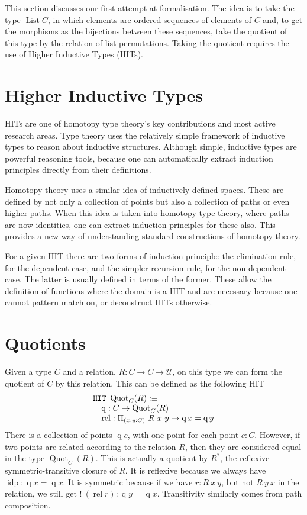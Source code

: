 \documentclass[12pt, parskip, DIV=14]{scrbook}
\newcommand{\defeq}{\vcentcolon\equiv}
\newcommand{\idp}{\operatorname{idp}}
\newcommand{\List}{\operatorname{List}}
\newcommand{\Quot}{\operatorname{Quot}_C(R)}
\newcommand{\q}{\operatorname{q}}
\newcommand{\rel}{\operatorname{rel}}
\begin{document}
This section discusses our first attempt at formalisation. The idea is to take the type $\List C$, in which elements are ordered sequences of elements of $C$ and, to get the morphisms as the bijections between these sequences, take the quotient of this type by the relation of list permutations. Taking the quotient requires the use of Higher Inductive Types (HITs).

\section{Higher Inductive Types}

HITs are one of homotopy type theory's key contributions and most active research areas. Type theory uses the relatively simple framework of inductive types to reason about inductive structures. Although simple, inductive types are powerful reasoning tools, because one can automatically extract induction principles directly from their definitions.

Homotopy theory uses a similar idea of inductively defined spaces. These are defined by not only a collection of points but also a collection of paths or even higher paths. When this idea is taken into homotopy type theory, where paths are now identities, one can extract induction principles for these also. This provides a new way of understanding standard constructions of homotopy theory.

For a given HIT there are two forms of induction principle: the elimination rule, for the dependent case, and the simpler recursion rule, for the non-dependent case. The latter is usually defined in terms of the former. These allow the definition of functions where the domain is a HIT and are necessary because one cannot pattern match on, or deconstruct HITs otherwise.

\section{Quotients}
\label{sec:quotients}

Given a type $C$ and a relation, $R : C \to C \to \mathcal{U}$, on this type we can form the quotient of $C$ by this relation. This can be defined as the following HIT
\begin{equation}
\label{eqn:quot}
\begin{array}{l}
  \mathtt{HIT}~\Quot \defeq \\
  \quad \q : C \to \Quot \\
  \quad \rel : \Pi_{(x,y : C)}~R~x~y \to \q x = \q y \\
\end{array}
\end{equation}
There is a collection of points $\q c$, with one point for each point $c : C$. However, if two points are related according to the relation $R$, then they are considered equal in the type $\Quot$. This is actually a quotient by $R^*$, the reflexive-symmetric-transitive closure of $R$. It is reflexive because we always have $\idp : \q x = \q x$. It is symmetric because if we have $r : R~x~y$, but not $R~y~x$ in the relation, we still get $!~(\rel r) : \q y = \q x$. Transitivity similarly comes from path composition.
\end{document}
